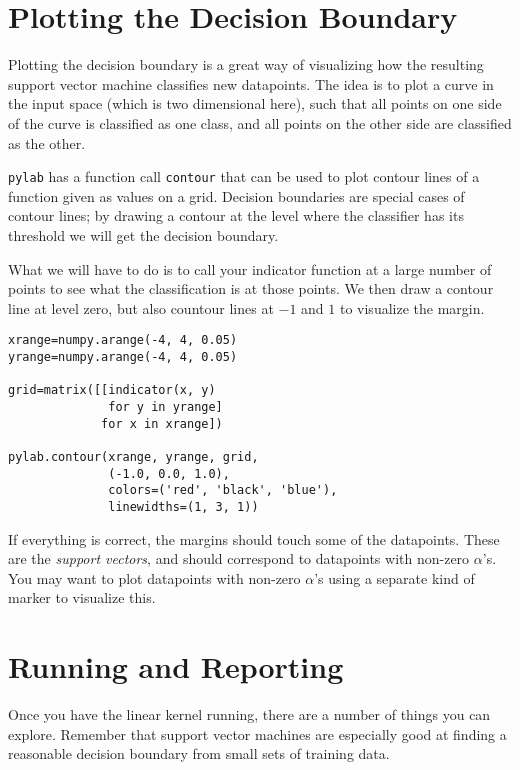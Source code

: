 \documentclass{article}
\begin{document}
\section{Plotting the Decision Boundary}

Plotting the decision boundary is a great way of visualizing how the
resulting support vector machine classifies new datapoints.  The idea
is to plot a curve in the input space (which is two dimensional here),
such that all points on one side of the curve is classified as one
class, and all points on the other side are classified as the other.

\texttt{pylab} has a function call \texttt{contour} that can be used
to plot contour lines of a function given as values on a grid.
Decision boundaries are special cases of contour lines; by drawing a
contour at the level where the classifier has its threshold we will
get the decision boundary.

What we will have to do is to call your indicator function at a large
number of points to see what the classification is at those points.
We then draw a contour line at level zero, but also countour lines at
\(-1\) and \(1\) to visualize the margin.

\begin{lstlisting}
xrange=numpy.arange(-4, 4, 0.05)
yrange=numpy.arange(-4, 4, 0.05)

grid=matrix([[indicator(x, y)
              for y in yrange]
             for x in xrange])

pylab.contour(xrange, yrange, grid,
              (-1.0, 0.0, 1.0),
              colors=('red', 'black', 'blue'),
              linewidths=(1, 3, 1))
\end{lstlisting}

If everything is correct, the margins should touch some of the
datapoints.  These are the \emph{support vectors}, and should
correspond to datapoints with non-zero \(\alpha\)'s.  You may want to
plot datapoints with non-zero \(\alpha\)'s using a separate kind of
marker to visualize this.

\section{Running and Reporting}

Once you have the linear kernel running, there are a number of things you
can explore.  Remember that support vector machines are especially
good at finding a reasonable decision boundary from small sets of
training data.
\end{document}
